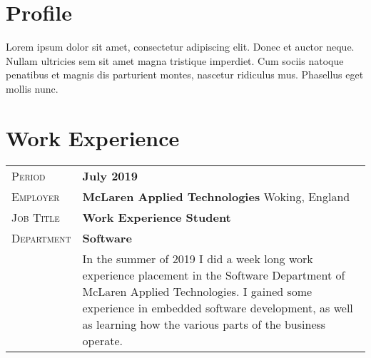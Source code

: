 \documentclass[a4paper, oneside, final]{scrartcl} %
\newcommand{\gray}{\rowcolor[gray]{.90}} %
\begin{document}
\begin{center} %


{\fontsize{36}{36}\selectfont\scshape{}} %

\vspace{1.5cm} %


\section{Profile}

Lorem ipsum dolor sit amet, consectetur adipiscing elit. Donec et auctor neque. Nullam ultricies sem sit amet magna tristique imperdiet. Cum sociis natoque penatibus et magnis dis parturient montes, nascetur ridiculus mus. Phasellus eget mollis nunc.


\section{Work Experience}

\begin{tabularx}{0.97\linewidth}{>{\raggedleft\scshape}p{2.5cm}X}
\gray Period & \textbf{July 2019}\\
\gray Employer & \textbf{McLaren Applied Technologies} \hfill Woking, England\\
\gray Job Title & \textbf{Work Experience Student}\\
\gray Department & \textbf{Software}\\
& In the summer of 2019 I did a week long work experience placement in the Software Department of McLaren Applied Technologies. I gained some experience in embedded software development, as well as learning how the various parts of the business operate.
\end{tabularx}


\end{center}
\end{document}
